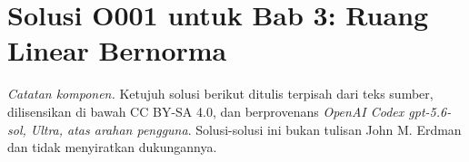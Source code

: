 \section*{Solusi O001 untuk Bab 3: Ruang Linear Bernorma}
\noindent\textit{Catatan komponen.}
Ketujuh solusi berikut ditulis terpisah dari teks sumber, dilisensikan di bawah
CC BY-SA 4.0, dan berprovenans
\emph{OpenAI Codex gpt-5.6-sol, Ultra, atas arahan pengguna}.
Solusi-solusi ini bukan tulisan John M. Erdman dan tidak menyiratkan dukungannya.


